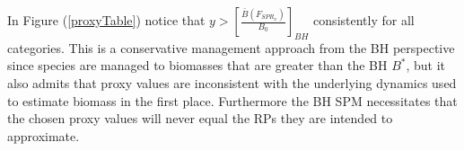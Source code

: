 

%
In Figure (\ref{proxyTable}) notice that $y>\left[\frac{\bar B(F_{SPR_x})}{B_0}\right]_{BH}$ %
consistently for all categories. This is a conservative management approach 
from the BH perspective since species are managed to biomasses %
that are greater than the BH $B^*$, but it also admits that proxy values 
are inconsistent with the underlying dynamics used to estimate biomass in 
the first place. Furthermore the BH SPM necessitates that the chosen proxy 
values will never equal the RPs they are intended to approximate.

%
%



%
%

